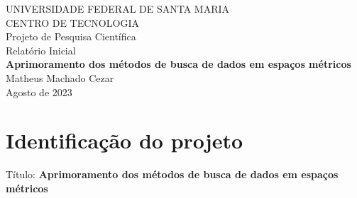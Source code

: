 \documentclass[a4paper,12pt,oneside]{article}
\title{\titulo}
\author{Matheus Machado Cezar}
\newcommand{\titulo}{Aprimoramento dos métodos de busca de dados em espaços métricos}
\newcommand{\edital}{nome do edital}
\begin{document}
\begin{titlepage}

\pagestyle{empty}
\begin{center}
\MakeUppercase{Universidade Federal de Santa Maria}\\
\MakeUppercase{Centro de Tecnologia}\\
\vspace*{\fill}
\vspace*{\fill}
\noindent \Large{Projeto de Pesquisa Científica} \\
\noindent \Large{Relatório Inicial} \\
\vspace*{\fill}
\noindent\Huge{\bf \titulo} \\
\vspace*{\fill}
\noindent \Large{Matheus Machado Cezar} \\
\vspace*{\fill}
\normalsize{Agosto de 2023}
\end{center}

\end{titlepage}

\pagestyle{fancy}

\tableofcontents            %
\newpage





\section{Identificação do projeto}

Título: {\bf \titulo}\\
\end{document}
